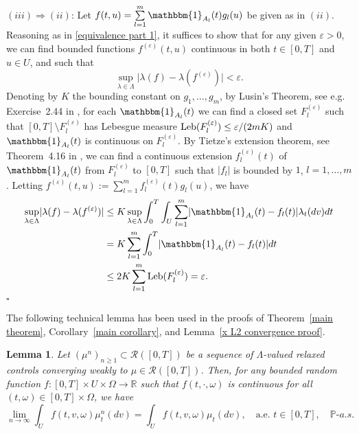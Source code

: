 \documentclass[12pt]{article}
\newtheorem{lemma}[prop]{Lemma}
\theoremstyle{named}
\numberwithin{equation}{section}
\newcommand{\abs}[1]{\lvert#1\rvert}
\def\P{{\mathord{\mathbb P}}}
\newenvironment{Proof}{\removelastskip\par\medskip \noindent{\em Proof.} \rm}{\penalty-20\null\hfill$\square$\par\medbreak}
\let\oldcitet=\citet
\renewcommand{\cite}[1]{\textcolor[rgb]{0,0,1}{\oldcitet{#1}}}
\renewcommand{\citet}[1]{\textcolor[rgb]{0,0,1}{\oldcitet{#1}}}
\begin{document}
\begin{Proof}
\noindent
 $(iii) \Rightarrow (ii)$:
Let $f(t,u) = \sum\limits_{l=1}^{m} \mathbbm{1}_{A_l}(t) g_l(u)$ be given as in $(ii)$.
Reasoning as in \eqref{equivalence part 1}, it suffices to show that for any given $\varepsilon > 0$, we can find bounded functions $f^{(\varepsilon )} (t,u)$
 continuous in both $t\in [0,T]$ and $u \in U$, and such that
\[
\sup\limits_{\lambda \in \Lambda} \abs{\lambda(f) - \lambda(f^{(\varepsilon )} )} < \varepsilon.
\]
Denoting by $K$ the bounding constant on
$g_1,\ldots , g_m$,
by Lusin's Theorem, see e.g. Exercise~2.44 in \cite{Folland1999}, for each $\mathbbm{1}_{A_l}(t)$ we can find a closed set $F^{(\varepsilon )}_l$ such that $[0,T]\setminus F^{(\varepsilon )}_l$ has Lebesgue measure
${\rm Leb}( F^{(\varepsilon )}_l) \leq \varepsilon / (2mK)$
 and $\mathbbm{1}_{A_l}(t)$ is continuous on $F^{(\varepsilon )}_l$.
 By Tietze's extension theorem,
 see Theorem~4.16 in \cite{Folland1999},
  we can find
 a continuous extension $f^{(\varepsilon )}_l(t)$ of $\mathbbm{1}_{A_l}(t)$ from $F^{(\varepsilon )}_l$ to $[0,T]$ such that  $|f_l|$ is bounded by $1$,
 $l=1,\ldots , m$.
 Letting $f^{(\varepsilon )} (t,u) := \sum\limits_{l=1}^{m} f_l^{(\varepsilon )}(t) g_l(u)$,
 we have
\begin{align*}
  \sup\limits_{\lambda \in \Lambda} \abs{\lambda(f) - \lambda(f^{(\varepsilon )} )} &\le
  K
  \sup\limits_{\lambda \in \Lambda} \int_0^T \int_U \sum\limits_{l=1}^{m} \abs{\mathbbm{1}_{A_l}(t) - f_l(t)} \lambda_t(dv) dt \\
  &=  K \sum\limits_{l=1}^{m} \int_0^T \abs{\mathbbm{1}_{A_l}(t) - f_l(t)} dt
  \\
  &\leq 2 K \sum\limits_{l=1}^{m} {\rm Leb}( F^{(\varepsilon )}_l)
   = \varepsilon.
\end{align*}
\end{Proof}
\noindent
 The following technical lemma has been used in the proofs of
Theorem~\ref{main theorem}, Corollary~\ref{main corollary},
and Lemma~\ref{x L2 convergence proof}.
\begin{lemma}
  \label{convergence implies uniform}
  Let
  $( \mu^n )_{ n \geq 1 }\subset \mathcal{R}([0,T] )$
  be a sequence of $\Lambda$-valued relaxed controls converging
  weakly to $\mu \in \mathcal{R}( [ 0, T ] )$. Then, for any bounded random function $f:[0,T] \times U \times \Omega \to \mathbb{R}$ such that
  $f(t,\cdot ,\omega)$ is continuous
  for all $(t, \omega) \in [0,T]\times \Omega$, we have
\begin{equation}
  \lim_{n\to \infty}
  \int_{U} f(t,v,\omega) \mu^n_t(dv)
  =
  \int_{U} f(t,v,\omega) \mu_t(dv),
  \quad
  \text{a.e. } t \in [0,T], \quad \P\mbox{-}a.s.
\end{equation}
\end{lemma}
\end{document}
